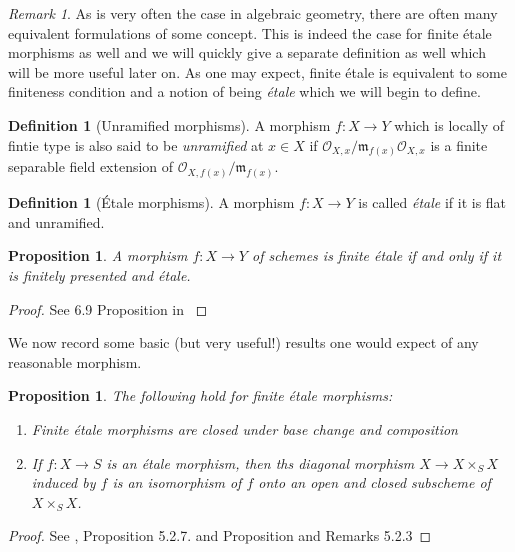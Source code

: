 \documentclass{article}
\theoremstyle{definition}
\newtheorem{definition2}[theorem]{Definition}
\theoremstyle{remark}
\newtheorem*{remark}{Remark}
\theoremstyle{plain}
\newtheorem{proposition}[theorem]{Proposition}
\newcommand{\mc}[1]{\mathcal{#1}}
\newcommand{\mk}[1]{\mathfrak{#1}}
\begin{document}
\begin{remark}
	As is very often the case in algebraic geometry, there are often many equivalent formulations of some concept.
	This is indeed the case for finite \'etale morphisms as well and we will quickly give a separate definition as well which will be more useful later on.
	As one may expect, finite \'etale is equivalent to some finiteness condition and a notion of being \textit{\'etale} which we will begin to define.

\end{remark}

\begin{definition2}[Unramified morphisms]
	A morphism $f: X \to Y$ which is locally of fintie type is also said to be \textit{unramified} at $x \in X$ if $\mc{O}_{X,x}/\mk{m}_{f(x)} \mc{O}_{X,x}$ is a finite separable field extension of $\mc{O}_{X, f(x)}/\mk{m}_{f(x)}$.
\end{definition2}


\begin{definition2}[\'Etale morphisms]
	A morphism $f: X \to Y$ is called \textit{\'etale} if it is flat and unramified.
\end{definition2}

\begin{proposition}
	A morphism $f: X \to Y$ of schemes is finite \'etale if and only if it is finitely presented and \'etale.
\end{proposition}
\begin{proof}
	See 6.9 Proposition in \cite{Lenstra}
\end{proof}



We now record some basic (but very useful!) results one would expect of any reasonable morphism.

\begin{proposition}
The following hold for finite \'etale morphisms: 
\begin{enumerate}
	\item Finite \'etale morphisms are closed under base change and composition
	\item If $f: X \to S$ is an \'etale morphism, then ths diagonal morphism $X \to X \times_S X$ induced by $f$ is an isomorphism of $f$ onto an open and closed subscheme of $X \times_S X$.
\end{enumerate}
\end{proposition}

\begin{proof}
	See \cite{Szamuely}, Proposition 5.2.7. and Proposition and Remarks 5.2.3
\end{proof}
\end{document}
